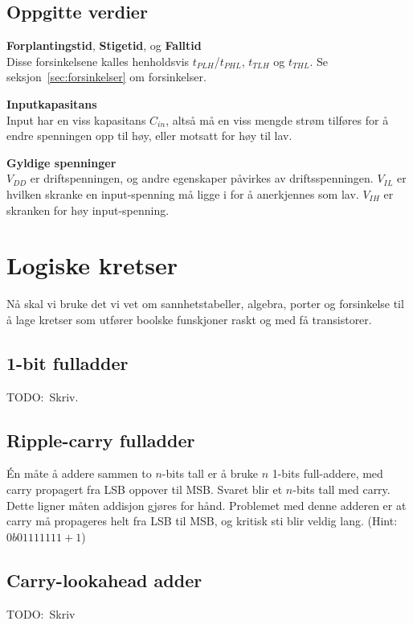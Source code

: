 \documentclass[12pt,a4paper,norsk]{article}
\begin{document}
\subsection{Oppgitte verdier}
\textbf{Forplantingstid}, \textbf{Stigetid}, og \textbf{Falltid}\\
Disse forsinkelsene kalles henholdsvis $t_{PLH}$/$t_{PHL}$, $t_{TLH}$ og
$t_{THL}$. Se seksjon~\ref{sec:forsinkelser} om forsinkelser.

\textbf{Inputkapasitans}\\
Input har en viss kapasitans $C_{in}$, altså må en viss mengde strøm tilføres for å endre
spenningen opp til høy, eller motsatt for høy til lav.

\textbf{Gyldige spenninger}\\
$V_{DD}$ er driftspenningen, og andre egenskaper påvirkes av driftsspenningen.
$V_{IL}$ er hvilken skranke en input-spenning må ligge i for å anerkjennes som
lav. $V_{IH}$ er skranken for høy input-spenning.

\section{Logiske kretser}\label{sec:logic_circuits}
Nå skal vi bruke det vi vet om sannhetstabeller, algebra, porter og forsinkelse
til å lage kretser som utfører boolske funskjoner raskt og med få transistorer.

\subsection{1-bit fulladder}
TODO:\ Skriv.

\subsection{Ripple-carry fulladder}\label{sec:ripple_carry_fulladder}
Én måte å addere sammen to $n$-bits tall er å bruke $n$ 1-bits full-addere, med
carry propagert fra LSB oppover til MSB\@. Svaret blir et $n$-bits tall med
carry. Dette ligner måten addisjon gjøres for hånd. Problemet med denne adderen
er at carry må propageres helt fra LSB til MSB, og kritisk sti blir veldig lang.
(Hint: $0b01111111 + 1$)

\subsection{Carry-lookahead adder}
TODO:\ Skriv
\end{document}
